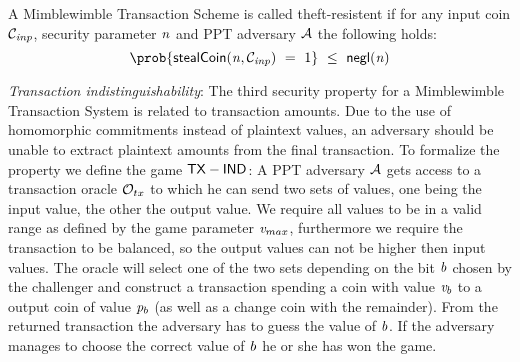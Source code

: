 \begin{center}
\end{center}

\begin{definition} \label{def:atom:theft-resistence}
    A Mimblewimble Transaction Scheme is called theft-resistent if for any input coin $\mathcal{C}_{\mathit{inp}}$, security parameter $\mathit{n}$ and PPT adversary $\mathcal{A}$ the following holds:
    \[ \prob{\procStealCoin{\varN}{\varCoinInp} \opEqNoQ 1 } \opSmEq \funNegl{\varN} \]
\end{definition}

\emph{Transaction indistinguishability}: The third security property for a Mimblewimble Transaction System is related to transaction amounts. Due to the use of homomorphic commitments instead of plaintext values,
an adversary should be unable to extract plaintext amounts from the final transaction. To formalize the property we define the game $\mathsf{TX-IND}$:
A PPT adversary $\mathcal{A}$ gets access to a transaction oracle $\mathcal{O}_{tx}$ to which he can send two sets of values, one being the input value, the other the output value. We require all values to be in
a valid range as defined by the game parameter $\mathit{v}_{max}$, furthermore we require the transaction to be balanced, so the output values can not be higher then input values. The oracle will select one of the two
sets depending on the bit $\mathit{b}$ chosen by the challenger and construct a transaction spending a coin with value $\mathit{v}_b$ to a output coin of value $\mathit{p}_b$ (as well as a change coin with the remainder).
From the returned transaction the adversary has to guess the value of $\mathit{b}$.
If the adversary manages to choose the correct value of $\mathit{b}$ he or she has won the game.

